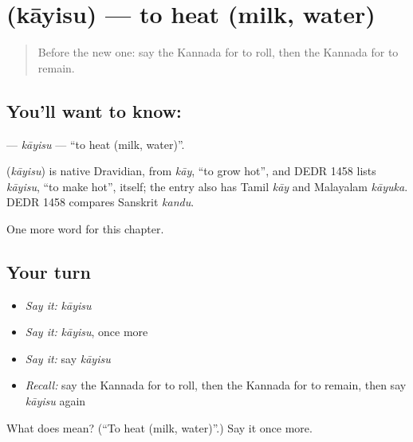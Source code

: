 \section[\texorpdfstring{\kn{ಕಾಯಿಸು} (kāyisu)}{ಕಾಯಿಸು (kāyisu)}]{ (kāyisu) — to heat (milk, water)}

\label{lesson:KA-C165-kayisu}



\begin{quote}
Before the new one: say the Kannada for to roll, then the Kannada for to remain.
\end{quote}

\subsection*{You'll want to know: }
\textbf{} — \emph{kāyisu} — \textquotedblleft{}to heat (milk, water)\textquotedblright{}.

\begin{cousinweb}
\textbf{} (\emph{kāyisu}) is native Dravidian, from \emph{kāy}, \textquotedblleft{}to grow hot\textquotedblright{}, and DEDR 1458 lists \emph{kāyisu}, \textquotedblleft{}to make hot\textquotedblright{}, itself; the entry also has Tamil \emph{kāy} and Malayalam \emph{kāyuka}. DEDR 1458 compares Sanskrit \emph{kandu}.
\end{cousinweb}

\begin{grammarlens}[title={What you've built}]
One more word for this chapter.
\end{grammarlens}

\subsection*{Your turn}
\begin{itemize}
\raggedright
  \item \emph{Say it:} \emph{kāyisu}
  \item \emph{Say it:} \emph{kāyisu}, once more
  \item \emph{Say it:} say \emph{kāyisu}
  \item \emph{Recall:} say the Kannada for to roll, then the Kannada for to remain, then say \emph{kāyisu} again
\end{itemize}

\begin{tcolorbox}[breakable,colback=teal!4,colframe=teal!35!black,title={Before you move on}]
What does  mean? (\textquotedblleft{}To heat (milk, water)\textquotedblright{}.) Say it once more.
\end{tcolorbox}
